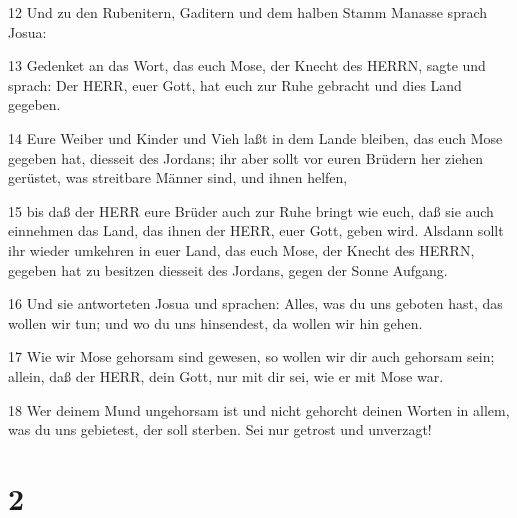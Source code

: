 \par 12 Und zu den Rubenitern, Gaditern und dem halben Stamm Manasse sprach Josua:
\par 13 Gedenket an das Wort, das euch Mose, der Knecht des HERRN, sagte und sprach: Der HERR, euer Gott, hat euch zur Ruhe gebracht und dies Land gegeben.
\par 14 Eure Weiber und Kinder und Vieh laßt in dem Lande bleiben, das euch Mose gegeben hat, diesseit des Jordans; ihr aber sollt vor euren Brüdern her ziehen gerüstet, was streitbare Männer sind, und ihnen helfen,
\par 15 bis daß der HERR eure Brüder auch zur Ruhe bringt wie euch, daß sie auch einnehmen das Land, das ihnen der HERR, euer Gott, geben wird. Alsdann sollt ihr wieder umkehren in euer Land, das euch Mose, der Knecht des HERRN, gegeben hat zu besitzen diesseit des Jordans, gegen der Sonne Aufgang.
\par 16 Und sie antworteten Josua und sprachen: Alles, was du uns geboten hast, das wollen wir tun; und wo du uns hinsendest, da wollen wir hin gehen.
\par 17 Wie wir Mose gehorsam sind gewesen, so wollen wir dir auch gehorsam sein; allein, daß der HERR, dein Gott, nur mit dir sei, wie er mit Mose war.
\par 18 Wer deinem Mund ungehorsam ist und nicht gehorcht deinen Worten in allem, was du uns gebietest, der soll sterben. Sei nur getrost und unverzagt!

\chapter{2}

